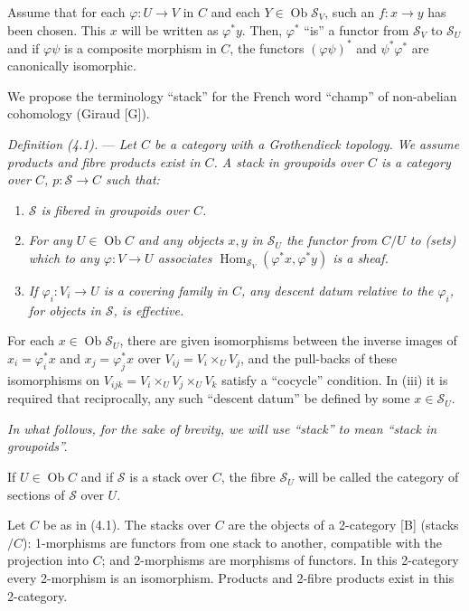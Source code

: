 \documentclass[10pt]{article}
\newcommand{\Hom}{\operatorname{Hom}}
\begin{document}
Assume that for each $\varphi:U\to V$ in $C$ and each $Y\in\operatorname{Ob}\mathscr S_V$, such an $f:x\to y$ has been chosen. This $x$ will be written as $\varphi^*y$. Then, $\varphi^*$ ``is'' a functor from $\mathscr S_V$ to $\mathscr S_U$ and if $\varphi\psi$ is a composite morphism in $C$, the functors $(\varphi\psi)^*$ and $\psi^*\varphi^*$ are canonically isomorphic.

We propose the terminology ``stack'' for the French word ``champ'' of non-abelian cohomology (Giraud [G]).

\medskip
\noindent\emph{Definition (4.1).} --- \emph{Let $C$ be a category with a Grothendieck topology. We assume products and fibre products exist in $C$. A stack in groupoids over $C$ is a category over $C$, $p:\mathscr S\to C$ such that:}
\begin{enumerate}[label=(\roman*)]
\item \emph{$\mathscr S$ is fibered in groupoids over $C$.}
\item \emph{For any $U\in\operatorname{Ob} C$ and any objects $x,y$ in $\mathscr S_U$ the functor from $C/U$ to (sets) which to any $\varphi:V\to U$ associates $\Hom_{\mathscr S_V}(\varphi^*x,\varphi^*y)$ is a sheaf.}
\item \emph{If $\varphi_i:V_i\to U$ is a covering family in $C$, any descent datum relative to the $\varphi_i$, for objects in $\mathscr S$, is effective.}
\end{enumerate}

For each $x\in\operatorname{Ob}\mathscr S_U$, there are given isomorphisms between the inverse images of $x_i=\varphi_i^*x$ and $x_j=\varphi_j^*x$ over $V_{ij}=V_i\times_U V_j$, and the pull-backs of these isomorphisms on $V_{ijk}=V_i\times_U V_j\times_U V_k$ satisfy a ``cocycle'' condition. In (iii) it is required that reciprocally, any such ``descent datum'' be defined by some $x\in\mathscr S_U$.

\emph{In what follows, for the sake of brevity, we will use ``stack'' to mean ``stack in groupoids''.}

If $U\in\operatorname{Ob} C$ and if $\mathscr S$ is a stack over $C$, the fibre $\mathscr S_U$ will be called the category of sections of $\mathscr S$ over $U$.

Let $C$ be as in (4.1). The stacks over $C$ are the objects of a 2-category [B] (stacks$/C$): 1-morphisms are functors from one stack to another, compatible with the projection into $C$; and 2-morphisms are morphisms of functors. In this 2-category every 2-morphism is an isomorphism. Products and 2-fibre products exist in this 2-category.
\end{document}
